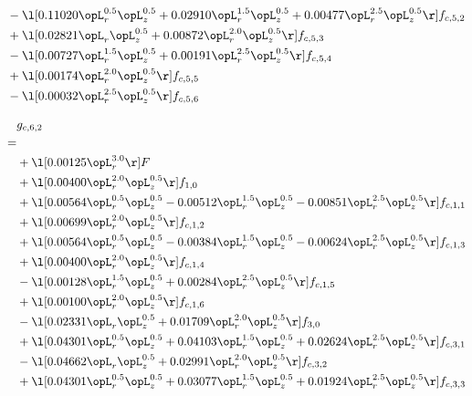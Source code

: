\begin{alignat}{2}
& - \l[  0.11020 \opL_r^{0.5} \opL_z^{0.5} +  0.02910 \opL_r^{1.5} \opL_z^{0.5} +  0.00477 \opL_r^{2.5} \opL_z^{0.5}  \r] f_{c,5,2} \nonumber \\ 
& + \l[  0.02821 \opL_r \opL_z^{0.5} +  0.00872 \opL_r^{2.0} \opL_z^{0.5}  \r] f_{c,5,3} \nonumber \\ 
& - \l[  0.00727 \opL_r^{1.5} \opL_z^{0.5} +  0.00191 \opL_r^{2.5} \opL_z^{0.5}  \r] f_{c,5,4} \nonumber \\ 
& + \l[  0.00174 \opL_r^{2.0} \opL_z^{0.5}  \r] f_{c,5,5} \nonumber \\ 
& - \l[  0.00032 \opL_r^{2.5} \opL_z^{0.5}  \r] f_{c,5,6} \nonumber \\ 
\end{alignat} 


\begin{alignat}{2} 
\label{eq:g_62_0} 
& g_{c,6,2} \nonumber \\ 
 = \\ 
& + \l[  0.00125 \opL_r^{3.0}  \r] F \nonumber \\ 
& + \l[  0.00400 \opL_r^{2.0} \opL_z^{0.5}  \r] f_{1,0} \nonumber \\ 
& + \l[  0.00564 \opL_r^{0.5} \opL_z^{0.5}   -0.00512 \opL_r^{1.5} \opL_z^{0.5}   -0.00851 \opL_r^{2.5} \opL_z^{0.5}  \r] f_{c,1,1} \nonumber \\ 
& + \l[  0.00699 \opL_r^{2.0} \opL_z^{0.5}  \r] f_{c,1,2} \nonumber \\ 
& + \l[  0.00564 \opL_r^{0.5} \opL_z^{0.5}   -0.00384 \opL_r^{1.5} \opL_z^{0.5}   -0.00624 \opL_r^{2.5} \opL_z^{0.5}  \r] f_{c,1,3} \nonumber \\ 
& + \l[  0.00400 \opL_r^{2.0} \opL_z^{0.5}  \r] f_{c,1,4} \nonumber \\ 
& - \l[  0.00128 \opL_r^{1.5} \opL_z^{0.5} +  0.00284 \opL_r^{2.5} \opL_z^{0.5}  \r] f_{c,1,5} \nonumber \\ 
& + \l[  0.00100 \opL_r^{2.0} \opL_z^{0.5}  \r] f_{c,1,6} \nonumber \\ 
& - \l[  0.02331 \opL_r \opL_z^{0.5} +  0.01709 \opL_r^{2.0} \opL_z^{0.5}  \r] f_{3,0} \nonumber \\ 
& + \l[  0.04301 \opL_r^{0.5} \opL_z^{0.5} +  0.04103 \opL_r^{1.5} \opL_z^{0.5} +  0.02624 \opL_r^{2.5} \opL_z^{0.5}  \r] f_{c,3,1} \nonumber \\ 
& - \l[  0.04662 \opL_r \opL_z^{0.5} +  0.02991 \opL_r^{2.0} \opL_z^{0.5}  \r] f_{c,3,2} \nonumber \\ 
& + \l[  0.04301 \opL_r^{0.5} \opL_z^{0.5} +  0.03077 \opL_r^{1.5} \opL_z^{0.5} +  0.01924 \opL_r^{2.5} \opL_z^{0.5}  \r] f_{c,3,3} \nonumber \\ 

\end{alignat}
